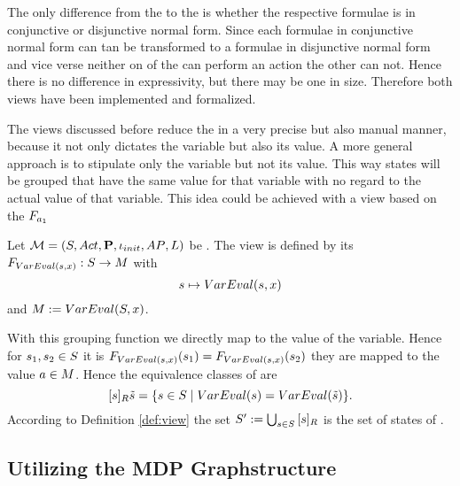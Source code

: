 \documentclass[preview]{standalone}
\begin{document}
The only difference from the \viewN \viewparamcnf to the \viewN \viewparamdnf is whether the respective formulae is in conjunctive or disjunctive normal form. Since each formulae in conjunctive normal form can tan be transformed to a formulae in disjunctive normal form and vice verse neither on of the \viewsN can perform an action the other can not. Hence there is no difference in expressivity, but there may be one in size. Therefore both views have been implemented and formalized. 

The views discussed before reduce the \chosengraphtypeN in a very precise but also manual manner, because it not only dictates the variable but also its value. A more general approach is to stipulate only the variable but not its value. This way states will be grouped that have the same value for that variable with no regard to the actual value of that variable. This idea could be achieved with a view based on the \grpfctN $\grpfct[\varval_1 ]$%

\begin{definition}
	Let $\chgph = \chgphtuple$ be \chosengraphtypeN. The view \viewparamvalident is defined by its \grpfctN $\gfctparamvalident : \states \to \imggrp$ with
	\[
	\state \mapsto \vareval(\state,\var)
	\]
	and $\imggrp := \vareval(\states, \var)$.
\end{definition}

With this grouping function we directly map to the value of the variable. Hence for $\state_1, \state_2 \in \states$ it is $\gfctparamvalident(\state_1) = \gfctparamvalident(\state_2)$ \iffN they are mapped to the value $\varval \in \imggrp$. Hence the equivalence classes of \eqrelview are
\[
\eqclassv{\smstate} = \{ \state \in \states \mid \vareval(\state) = \vareval(\smstate)\}.
\]
According to Definition \ref{def:view} the set $\states' := \bigcup_{\state \in \states} \eqclassv$ is the set of states of \viewparamvalident.


\subsection{Utilizing the MDP Graphstructure}
\end{document}
